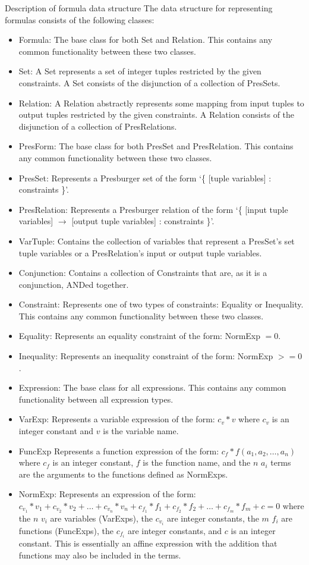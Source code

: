\documentclass{book}
\begin{document}
\begin{section}{Description of formula data structure}
The data structure for representing formulas consists of the following classes:

\begin{itemize}
\item Formula:
	The base class for both Set and Relation.
	This contains any common functionality between these two classes.
\item Set:
	A Set represents a set of integer tuples restricted by the given constraints.
	A Set consists of the disjunction of a collection of PresSets.
\item Relation:
	A Relation abstractly represents some mapping from input tuples to output tuples restricted by the given constraints.
	A Relation consists of the disjunction of a collection of PresRelations.
\item PresForm:
	The base class for both PresSet and PresRelation.
	This contains any common functionality between these two classes.
\item PresSet:
	Represents a Presburger set of the form `\{ [tuple variables] : constraints \}'.
\item PresRelation:
	Represents a Presburger relation of the form `\{ [input tuple variables] $\rightarrow$ [output tuple variables] : constraints \}'.
\item VarTuple:
	Contains the collection of variables that represent a PresSet's set tuple variables or a PresRelation's input or output tuple variables.
\item Conjunction:
	Contains a collection of Constraints that are, as it is a conjunction, ANDed together.
\item Constraint:
	Represents one of two types of constraints: Equality or Inequality.
	This contains any common functionality between these two classes.
\item Equality:
	Represents an equality constraint of the form: NormExp $=0$.
\item Inequality:
	Represents an inequality constraint of the form: NormExp $>=0$.
\item Expression:
	The base class for all expressions.
	This contains any common functionality between all expression types.
\item VarExp:
	Represents a variable expression of the form: $c_v*v$ where $c_v$ is an integer constant and $v$ is the variable name.
\item FuncExp
	Represents a function expression of the form: $c_f*f(a_{1},a_{2},\ldots,a_{n})$ where $c_f$ is an integer constant, $f$ is the function name, and the $n$ $a_{i}$ terms are the arguments to the functions defined as NormExps.
\item NormExp:
	Represents an expression of the form: $c_{v_1}*v_{1} + c_{v_2}*v_{2} + \ldots + c_{v_n}*v_{n} + c_{f_1}*f_{1} + c_{f_2}*f_{2} + \ldots + c_{f_m}*f_{m} + c = 0$ where the $n$ $v_{i}$ are variables (VarExps), the $c_{v_i}$ are integer constants, the $m$ $f_{i}$ are functions (FuncExps), the $c_{f_i}$ are integer constants, and $c$ is an integer constant.
	This is essentially an affine expression with the addition that functions may also be included in the terms.
\end{itemize}


\end{section}
\end{document}
